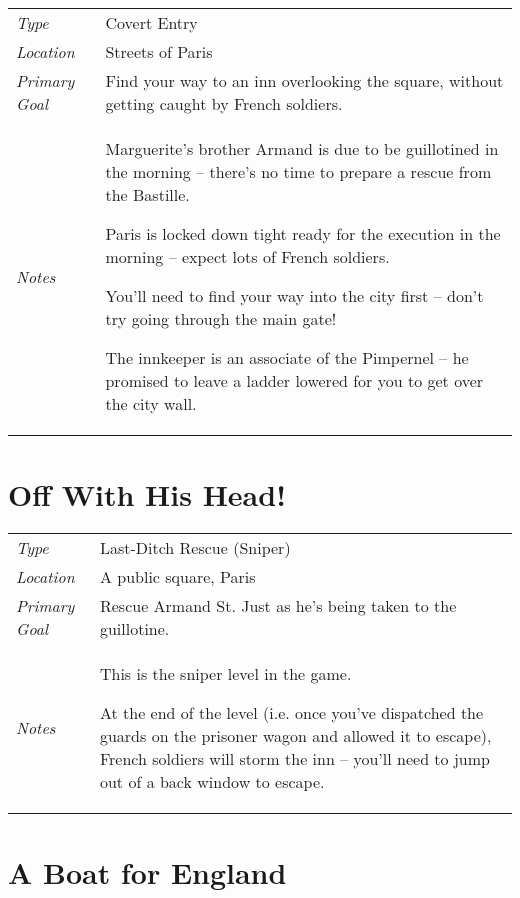 \begin{tabular}{lp{12cm}}
\emph{Type} & Covert Entry \\
\emph{Location} & Streets of Paris \\
\emph{Primary Goal} & Find your way to an inn overlooking the square, without getting caught by French soldiers. \\
\emph{Notes} &
  \vspace{-\baselineskip}
	\begin{list}{}{\leftmargin=1em}
	\item Marguerite's brother Armand is due to be guillotined in the morning -- there's no time to prepare a rescue from the Bastille.
	\item Paris is locked down tight ready for the execution in the morning -- expect lots of French soldiers.
	\item You'll need to find your way into the city first -- don't try going through the main gate!
	\item The innkeeper is an associate of the Pimpernel -- he promised to leave a ladder lowered for you to get over the city wall.
	\end{list}
\end{tabular}

\section{Off With His Head!}

\begin{tabular}{lp{12cm}}
\emph{Type} & Last-Ditch Rescue (Sniper) \\
\emph{Location} & A public square, Paris \\
\emph{Primary Goal} & Rescue Armand St. Just as he's being taken to the guillotine. \\
\emph{Notes} &
	\vspace{-\baselineskip}
	\begin{list}{}{\leftmargin=1em}
	\item This is the sniper level in the game.
	\item At the end of the level (i.e. once you've dispatched the guards on the prisoner wagon and allowed it to escape), French soldiers will storm the inn -- you'll need to jump out of a back window to escape.
	\end{list}
\end{tabular}

\section{A Boat for England}

